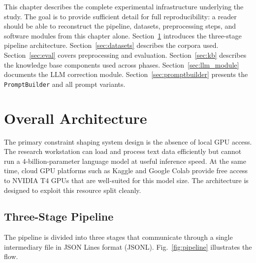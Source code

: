 \setlength{\parskip}{0.5\baselineskip}

This chapter describes the complete experimental infrastructure underlying the study.
The goal is to provide sufficient detail for full reproducibility: a reader should be
able to reconstruct the pipeline, datasets, preprocessing steps, and software modules
from this chapter alone.
Section~\ref{sec:arch} introduces the three-stage pipeline architecture.
Section~\ref{sec:datasets} describes the corpora used.
Section~\ref{sec:eval} covers preprocessing and evaluation.
Section~\ref{sec:kb} describes the knowledge base components used across phases.
Section~\ref{sec:llm_module} documents the LLM correction module.
Section~\ref{sec:promptbuilder} presents the \texttt{PromptBuilder} and all prompt
variants.

\section{Overall Architecture}
\label{sec:arch}

The primary constraint shaping system design is the absence of local GPU access.
The research workstation can load and process text data efficiently but cannot
run a 4-billion-parameter language model at useful inference speed.
At the same time, cloud GPU platforms such as Kaggle and Google Colab provide
free access to NVIDIA T4 GPUs that are well-suited for this model size.
The architecture is designed to exploit this resource split cleanly.

\subsection{Three-Stage Pipeline}
\label{subsec:pipeline}

The pipeline is divided into three stages that communicate through a single
intermediary file in JSON Lines format (JSONL).
Fig.~\ref{fig:pipeline} illustrates the flow.

